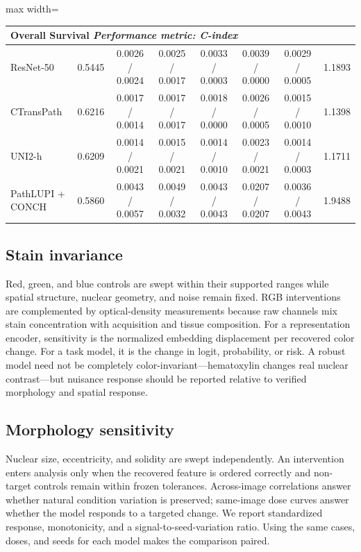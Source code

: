 \begin{table}[t]
\begin{adjustbox}{max width=\textwidth}
\begin{tabular}{lccccccc}
\midrule

\multicolumn{8}{l}{\textbf{Overall Survival} \hfill \textit{Performance metric: C-index}} \\
\midrule

ResNet-50
& 0.5445
& 0.0026 / 0.0024
& 0.0025 / 0.0017
& 0.0033 / 0.0003
& 0.0039 / 0.0000
& 0.0029 / 0.0005
& 1.1893 \\

CTransPath
& 0.6216
& 0.0017 / 0.0014
& 0.0017 / 0.0017
& 0.0018 / 0.0000
& 0.0026 / 0.0005
& 0.0015 / 0.0010
& 1.1398 \\

UNI2-h
& 0.6209
& 0.0014 / 0.0021
& 0.0015 / 0.0021
& 0.0014 / 0.0010
& 0.0023 / 0.0021
& 0.0014 / 0.0003
& 1.1711 \\

PathLUPI + CONCH
& 0.5860
& 0.0043 / 0.0057
& 0.0049 / 0.0032
& 0.0043 / 0.0043
& 0.0207 / 0.0207
& 0.0036 / 0.0043
& 1.9488 \\

\bottomrule
\end{tabular}
\end{adjustbox}

\end{table}

\subsection{Stain invariance}

Red, green, and blue controls are swept within their supported ranges while spatial structure, nuclear geometry, and noise remain fixed. RGB interventions are complemented by optical-density measurements because raw channels mix stain concentration with acquisition and tissue composition. For a representation encoder, sensitivity is the normalized embedding displacement per recovered color change. For a task model, it is the change in logit, probability, or risk. A robust model need not be completely color-invariant---hematoxylin changes real nuclear contrast---but nuisance response should be reported relative to verified morphology and spatial response.

\subsection{Morphology sensitivity}

Nuclear size, eccentricity, and solidity are swept independently. An intervention enters analysis only when the recovered feature is ordered correctly and non-target controls remain within frozen tolerances. Across-image correlations answer whether natural condition variation is preserved; same-image dose curves answer whether the model responds to a targeted change. We report standardized response, monotonicity, and a signal-to-seed-variation ratio. Using the same cases, doses, and seeds for each model makes the comparison paired.

